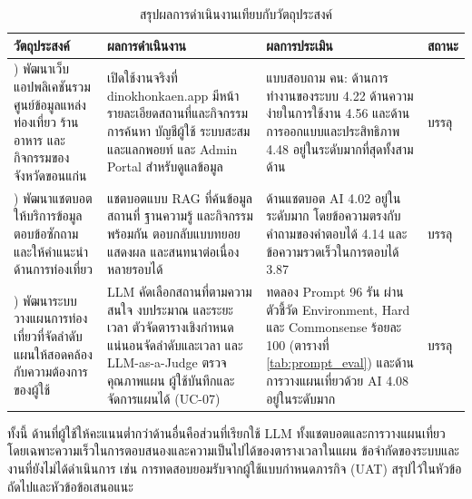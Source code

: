 \begin{table}[H]
\centering
\caption{สรุปผลการดำเนินงานเทียบกับวัตถุประสงค์}
\label{tab:objectives}
{\small
\begin{tabular}{|>{\raggedright\arraybackslash}p{3.1cm}|>{\raggedright\arraybackslash}p{4.5cm}|>{\raggedright\arraybackslash}p{4.3cm}|>{\raggedright\arraybackslash}p{1.7cm}|}
\hline
\textbf{วัตถุประสงค์} & \textbf{ผลการดำเนินงาน} & \textbf{ผลการประเมิน} & \textbf{สถานะ} \\
\hline
1) พัฒนาเว็บแอปพลิเคชันรวมศูนย์ข้อมูลแหล่งท่องเที่ยว ร้านอาหาร และกิจกรรมของจังหวัดขอนแก่น & เปิดใช้งานจริงที่ dinokhonkaen.app มีหน้ารายละเอียดสถานที่และกิจกรรม การค้นหา บัญชีผู้ใช้ ระบบสะสมและแลกพอยท์ และ Admin Portal สำหรับดูแลข้อมูล & แบบสอบถาม \surveyN{} คน: ด้านการทำงานของระบบ 4.22 ด้านความง่ายในการใช้งาน 4.56 และด้านการออกแบบและประสิทธิภาพ 4.48 อยู่ในระดับมากที่สุดทั้งสามด้าน & บรรลุ \\ \hline
2) พัฒนาแชตบอตให้บริการข้อมูล ตอบข้อซักถาม และให้คำแนะนำด้านการท่องเที่ยว & แชตบอตแบบ RAG ที่ค้นข้อมูลสถานที่ ฐานความรู้ และกิจกรรมพร้อมกัน ตอบกลับแบบทยอยแสดงผล และสนทนาต่อเนื่องหลายรอบได้ & ด้านแชตบอต AI 4.02 อยู่ในระดับมาก โดยข้อความตรงกับคำถามของคำตอบได้ 4.14 และข้อความรวดเร็วในการตอบได้ 3.87 & บรรลุ \\ \hline
3) พัฒนาระบบวางแผนการท่องเที่ยวที่จัดลำดับแผนให้สอดคล้องกับความต้องการของผู้ใช้ & LLM คัดเลือกสถานที่ตามความสนใจ งบประมาณ และระยะเวลา ตัวจัดตารางเชิงกำหนดแน่นอนจัดลำดับและเวลา และ LLM-as-a-Judge ตรวจคุณภาพแผน ผู้ใช้บันทึกและจัดการแผนได้ (UC-07) & ทดลอง Prompt 96 รัน ผ่านตัวชี้วัด Environment, Hard และ Commonsense ร้อยละ 100 (ตารางที่ \ref{tab:prompt_eval}) และด้านการวางแผนเที่ยวด้วย AI 4.08 อยู่ในระดับมาก & บรรลุ \\ \hline
\end{tabular}
\par}
\end{table}

ทั้งนี้ ด้านที่ผู้ใช้ให้คะแนนต่ำกว่าด้านอื่นคือส่วนที่เรียกใช้ LLM ทั้งแชตบอตและการวางแผนเที่ยว โดยเฉพาะความเร็วในการตอบสนองและความเป็นไปได้ของตารางเวลาในแผน ข้อจำกัดของระบบและงานที่ยังไม่ได้ดำเนินการ เช่น การทดสอบยอมรับจากผู้ใช้แบบกำหนดภารกิจ (UAT) สรุปไว้ในหัวข้อถัดไปและหัวข้อข้อเสนอแนะ


